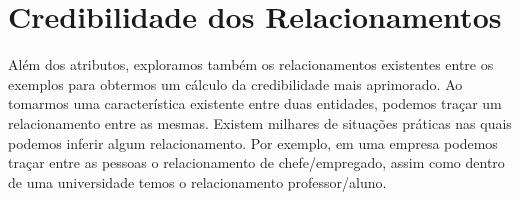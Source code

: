 


\section{Credibilidade dos Relacionamentos}
\label{sec::classificacaografos}

Além dos atributos, exploramos também os relacionamentos existentes entre os exemplos para obtermos um cálculo da credibilidade mais aprimorado.
Ao tomarmos uma característica existente entre duas entidades, podemos traçar um relacionamento entre as mesmas.
Existem milhares de situações práticas nas quais podemos inferir algum relacionamento. Por exemplo, em uma empresa podemos traçar entre as pessoas o relacionamento de chefe/empregado, assim como dentro de uma universidade temos o relacionamento professor/aluno.


